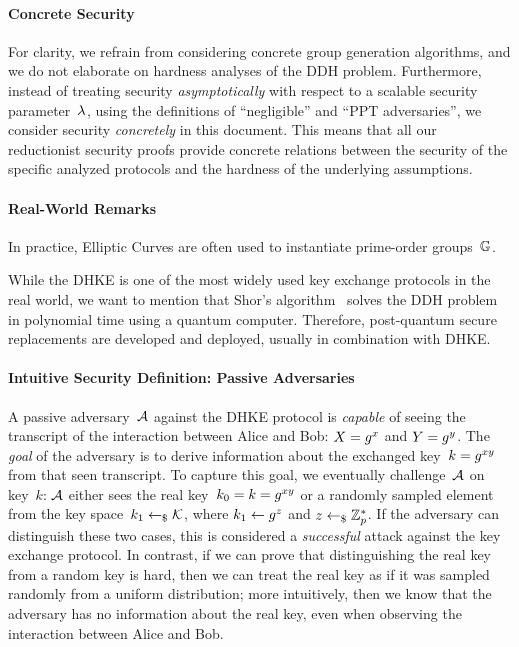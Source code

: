\paragraph{Concrete Security}
For clarity, we refrain from considering concrete group generation algorithms, and we do not elaborate on hardness analyses of the DDH problem.
Furthermore, instead of treating security \emph{asymptotically} with respect to a scalable security parameter~$\lambda$, using the definitions of ``negligible'' and ``PPT adversaries'', we consider security \emph{concretely} in this document.
This means that all our reductionist security proofs provide concrete relations between the security of the specific analyzed protocols and the hardness of the underlying assumptions.

\paragraph{Real-World Remarks}
In practice, Elliptic Curves are often used to instantiate prime-order groups~$\mathbb{G}$.

While the DHKE is one of the most widely used key exchange protocols in the real world, we want to mention that Shor's algorithm~\cite{FOCS:Shor94} solves the DDH problem in polynomial time using a quantum computer.
Therefore, post-quantum secure replacements are developed and deployed, usually in combination with DHKE.

\paragraph{Intuitive Security Definition: Passive Adversaries}
A passive adversary~$\mathcal{A}$ against the DHKE protocol is \emph{capable} of seeing the transcript of the interaction between Alice and Bob: $X=g^x$ and $Y=g^y$.
The \emph{goal} of the adversary is to derive information about the exchanged key~$k=g^{xy}$ from that seen transcript.
To capture this goal, we eventually challenge~$\mathcal{A}$ on key~$k$:
$\mathcal{A}$ either sees the real key~$k_0=k=g^{xy}$ or a randomly sampled element from the key space~$k_1\gets_\$\mathcal{K}$, where $k_1\gets g^z$ and $z\gets_\$\mathbb{Z}_p^*$.
If the adversary can distinguish these two cases, this is considered a \emph{successful} attack against the key exchange protocol.
In contrast, if we can prove that distinguishing the real key from a random key is hard, then we can treat the real key as if it was sampled randomly from a uniform distribution;
more intuitively, then we know that the adversary has no information about the real key, even when observing the interaction between Alice and Bob.

